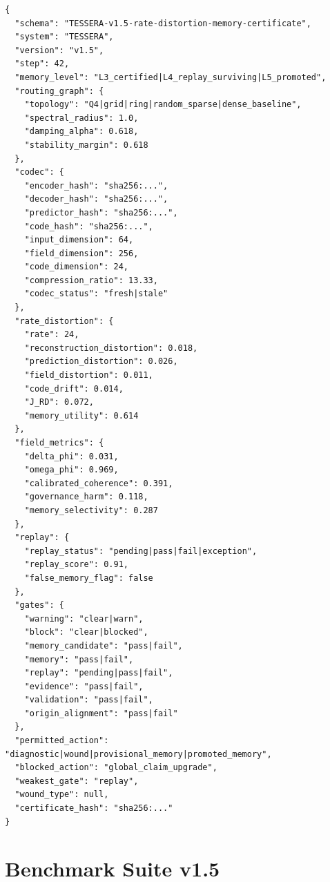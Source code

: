 \documentclass[12pt]{article}
\begin{document}
\begin{lstlisting}
{
  "schema": "TESSERA-v1.5-rate-distortion-memory-certificate",
  "system": "TESSERA",
  "version": "v1.5",
  "step": 42,
  "memory_level": "L3_certified|L4_replay_surviving|L5_promoted",
  "routing_graph": {
    "topology": "Q4|grid|ring|random_sparse|dense_baseline",
    "spectral_radius": 1.0,
    "damping_alpha": 0.618,
    "stability_margin": 0.618
  },
  "codec": {
    "encoder_hash": "sha256:...",
    "decoder_hash": "sha256:...",
    "predictor_hash": "sha256:...",
    "code_hash": "sha256:...",
    "input_dimension": 64,
    "field_dimension": 256,
    "code_dimension": 24,
    "compression_ratio": 13.33,
    "codec_status": "fresh|stale"
  },
  "rate_distortion": {
    "rate": 24,
    "reconstruction_distortion": 0.018,
    "prediction_distortion": 0.026,
    "field_distortion": 0.011,
    "code_drift": 0.014,
    "J_RD": 0.072,
    "memory_utility": 0.614
  },
  "field_metrics": {
    "delta_phi": 0.031,
    "omega_phi": 0.969,
    "calibrated_coherence": 0.391,
    "governance_harm": 0.118,
    "memory_selectivity": 0.287
  },
  "replay": {
    "replay_status": "pending|pass|fail|exception",
    "replay_score": 0.91,
    "false_memory_flag": false
  },
  "gates": {
    "warning": "clear|warn",
    "block": "clear|blocked",
    "memory_candidate": "pass|fail",
    "memory": "pass|fail",
    "replay": "pending|pass|fail",
    "evidence": "pass|fail",
    "validation": "pass|fail",
    "origin_alignment": "pass|fail"
  },
  "permitted_action": "diagnostic|wound|provisional_memory|promoted_memory",
  "blocked_action": "global_claim_upgrade",
  "weakest_gate": "replay",
  "wound_type": null,
  "certificate_hash": "sha256:..."
}
\end{lstlisting}

\section{Benchmark Suite v1.5}
\end{document}
